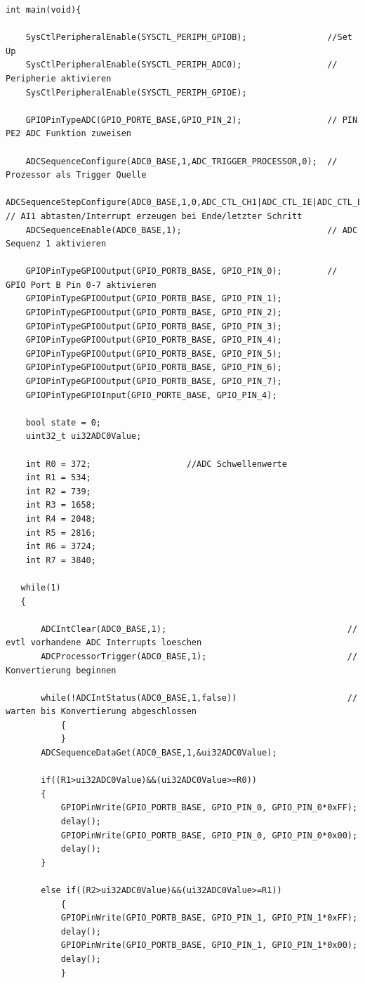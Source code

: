 \begin{lstlisting}
int main(void){

    SysCtlPeripheralEnable(SYSCTL_PERIPH_GPIOB);                //Set Up
    SysCtlPeripheralEnable(SYSCTL_PERIPH_ADC0);                 // Peripherie aktivieren
    SysCtlPeripheralEnable(SYSCTL_PERIPH_GPIOE);

    GPIOPinTypeADC(GPIO_PORTE_BASE,GPIO_PIN_2);                 // PIN PE2 ADC Funktion zuweisen

    ADCSequenceConfigure(ADC0_BASE,1,ADC_TRIGGER_PROCESSOR,0);  // Prozessor als Trigger Quelle
    ADCSequenceStepConfigure(ADC0_BASE,1,0,ADC_CTL_CH1|ADC_CTL_IE|ADC_CTL_END); // AI1 abtasten/Interrupt erzeugen bei Ende/letzter Schritt
    ADCSequenceEnable(ADC0_BASE,1);                             // ADC Sequenz 1 aktivieren

    GPIOPinTypeGPIOOutput(GPIO_PORTB_BASE, GPIO_PIN_0);         // GPIO Port B Pin 0-7 aktivieren
    GPIOPinTypeGPIOOutput(GPIO_PORTB_BASE, GPIO_PIN_1);
    GPIOPinTypeGPIOOutput(GPIO_PORTB_BASE, GPIO_PIN_2);
    GPIOPinTypeGPIOOutput(GPIO_PORTB_BASE, GPIO_PIN_3);
    GPIOPinTypeGPIOOutput(GPIO_PORTB_BASE, GPIO_PIN_4);
    GPIOPinTypeGPIOOutput(GPIO_PORTB_BASE, GPIO_PIN_5);
    GPIOPinTypeGPIOOutput(GPIO_PORTB_BASE, GPIO_PIN_6);
    GPIOPinTypeGPIOOutput(GPIO_PORTB_BASE, GPIO_PIN_7);
    GPIOPinTypeGPIOInput(GPIO_PORTE_BASE, GPIO_PIN_4);

    bool state = 0;
    uint32_t ui32ADC0Value;

    int R0 = 372;                   //ADC Schwellenwerte
    int R1 = 534;
    int R2 = 739;
    int R3 = 1658;
    int R4 = 2048;
    int R5 = 2816;
    int R6 = 3724;
    int R7 = 3840;

   while(1)
   {

       ADCIntClear(ADC0_BASE,1);                                    // evtl vorhandene ADC Interrupts loeschen
       ADCProcessorTrigger(ADC0_BASE,1);                            // Konvertierung beginnen

       while(!ADCIntStatus(ADC0_BASE,1,false))                      // warten bis Konvertierung abgeschlossen
           {
           }
       ADCSequenceDataGet(ADC0_BASE,1,&ui32ADC0Value);

       if((R1>ui32ADC0Value)&&(ui32ADC0Value>=R0))
       {
           GPIOPinWrite(GPIO_PORTB_BASE, GPIO_PIN_0, GPIO_PIN_0*0xFF);
           delay();
           GPIOPinWrite(GPIO_PORTB_BASE, GPIO_PIN_0, GPIO_PIN_0*0x00);
           delay();
       }

       else if((R2>ui32ADC0Value)&&(ui32ADC0Value>=R1))
           {
           GPIOPinWrite(GPIO_PORTB_BASE, GPIO_PIN_1, GPIO_PIN_1*0xFF);
           delay();
           GPIOPinWrite(GPIO_PORTB_BASE, GPIO_PIN_1, GPIO_PIN_1*0x00);
           delay();
           }


\end{lstlisting}
